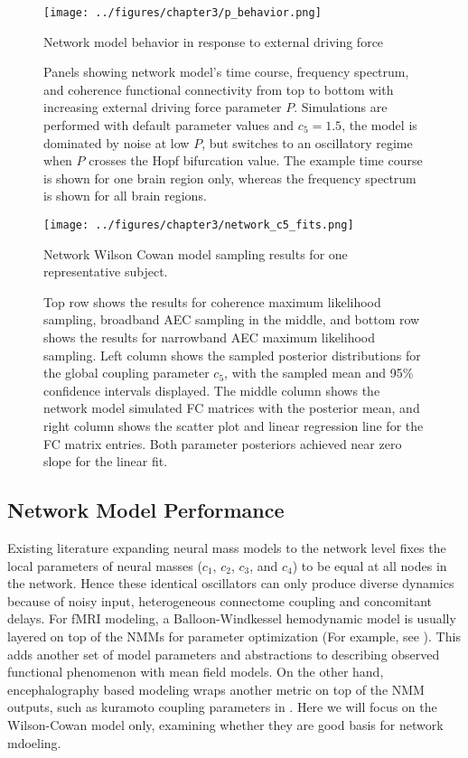 \begin{figure}[htbp]
    \centering
    \texttt{[image: ../figures/chapter3/p\_behavior.png]}
    \caption{Network model behavior in response to external driving force}
    \caption*{Panels showing network model's time course, frequency spectrum, and coherence functional connectivity from top to bottom with increasing external driving force parameter $P$. Simulations are performed with default parameter values and $c_5 = 1.5$, the model is dominated by noise at low $P$, but switches to an oscillatory regime when $P$ crosses the Hopf bifurcation value. The example time course is shown for one brain region only, whereas the frequency spectrum is shown for all brain regions.}
    \label{fig:p_behavior}
\end{figure}

\begin{figure}[htbp]
    \centering
    \texttt{[image: ../figures/chapter3/network\_c5\_fits.png]}
    \caption{Network Wilson Cowan model sampling results for one representative subject.}
    \caption*{Top row shows the results for coherence maximum likelihood sampling, broadband AEC sampling in the middle, and bottom row shows the results for narrowband AEC maximum likelihood sampling. Left column shows the sampled posterior distributions for the global coupling parameter $c_5$, with the sampled mean and 95\% confidence intervals displayed. The middle column shows the network model simulated FC matrices with the posterior mean, and right column shows the scatter plot and linear regression line for the FC matrix entries. Both parameter posteriors achieved near zero slope for the linear fit.}
    \label{fig:networkc5}
\end{figure}

\subsection{Network Model Performance}
Existing literature expanding neural mass models to the network level fixes the local parameters of neural masses ($c_1$, $c_2$, $c_3$, and $c_4$) to be equal at all nodes in the network. Hence these identical oscillators can only produce diverse dynamics because of noisy input, heterogeneous connectome coupling and concomitant delays. For fMRI modeling, a Balloon-Windkessel hemodynamic model \cite{buxton_dynamics_1998, friston_nonlinear_2000} is usually layered on top of the NMMs for parameter optimization (For example, see \cite{Zimmermann2018}). This adds another set of model parameters and abstractions to describing observed functional phenomenon with mean field models. On the other hand, encephalography based modeling wraps another metric on top of the NMM outputs, such as kuramoto coupling parameters in \cite{Deco2009}.  Here we will focus on the Wilson-Cowan model only, examining whether they are good basis for network mdoeling.

